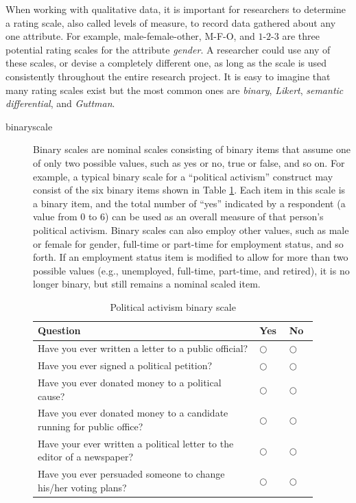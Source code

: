 When working with qualitative data, it is important for researchers to determine a rating scale, also called levels of measure, to record data gathered about any one attribute. For example, male-female-other, M-F-O, and $ 1 $-$ 2 $-$ 3 $ are three potential rating scales for the attribute \textit{gender}. A researcher could use any of these scales, or devise a completely different one, as long as the scale is used consistently throughout the entire research project. It is easy to imagine that many rating scales exist but the most common ones are \textit{binary}, \textit{Likert}, \textit{semantic differential}, and \textit{Guttman}. 

\begin{description}
	\item[\Gls{binaryscale}] Binary scales are nominal scales consisting of binary items that assume one of only two possible values, such as yes or no, true or false, and so on. For example, a typical binary scale for a ``political activism'' construct may consist of the six binary items shown in Table \ref{tab06.02}. Each item in this scale is a binary item, and the total number of ``yes'' indicated by a respondent (a value from $ 0 $ to $ 6 $) can be used as an overall measure of that person's political activism. Binary scales can also employ other values, such as male or female for gender, full-time or part-time for employment status, and so forth. If an employment status item is modified to allow for more than two possible values (e.g., unemployed, full-time, part-time, and retired), it is no longer binary, but still remains a nominal scaled item.
	
	\begin{table}[H]
		\centering
		\begin{tabularx}{0.95\linewidth}{p{0.70\linewidth}p{0.09\linewidth}p{0.09\linewidth}}
			\toprule
			\textbf{Question} & \textbf{Yes} & \textbf{No} \\
			\midrule
			Have you ever written a letter to a public official? & $ \bigcirc $ & $ \bigcirc $ \\ 
			Have you ever signed a political petition? & $ \bigcirc $ & $ \bigcirc $ \\ 
			Have you ever donated money to a political cause? & $ \bigcirc $ & $ \bigcirc $ \\ 
			Have you ever donated money to a candidate running for public office? & $ \bigcirc $ & $ \bigcirc $ \\ 
			Have your ever written a political letter to the editor of a newspaper?& $ \bigcirc $ & $ \bigcirc $ \\ 
			Have you ever persuaded someone to change his/her voting plans? & $ \bigcirc $ & $ \bigcirc $ \\ 
			\bottomrule
		\end{tabularx}
		\caption{Political activism binary scale}
		\label{tab06.02}
	\end{table}
	

\end{description}
